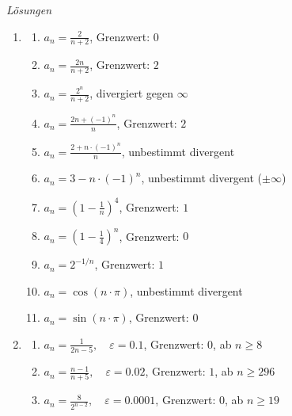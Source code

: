 \clearpage
\emph{Lösungen}
\begin{enumerate}
	\item \begin{enumerate}
		      \item $a_n = \frac{2}{n+2}$, \quad Grenzwert: $0$
		      \item $a_n = \frac{2n}{n+2}$, \quad Grenzwert: $2$
		      \item $a_n = \frac{2^n}{n+2}$, \quad divergiert gegen $\infty$
		      \item $a_n = \frac{2n + (-1)^n}{n}$, \quad Grenzwert: $2$
		      \item $a_n = \frac{2 + n \cdot (-1)^n}{n}$, \quad unbestimmt divergent
		      \item $a_n = 3 - n \cdot (-1)^n$, \quad unbestimmt divergent ($\pm \infty$)
		      \item $a_n = \left(1 - \frac{1}{n}\right)^4$, \quad Grenzwert: $1$
		      \item $a_n = \left(1 - \frac{1}{4}\right)^n$, \quad Grenzwert: $0$
		      \item $a_n = 2^{-1/n}$, \quad Grenzwert: $1$
		      \item $a_n = \cos(n\cdot \pi)$, \quad unbestimmt divergent
		      \item $a_n = \sin(n\cdot \pi)$, \quad Grenzwert: $0$
	      \end{enumerate}

	\item
	      \begin{enumerate}
		      \item $a_n = \frac{1}{2n - 5}, \quad \varepsilon = 0.1$, \quad Grenzwert: $0$, ab $n \geq 8$
		      \item $a_n = \frac{n - 1}{n + 5}, \quad \varepsilon = 0.02$, \quad Grenzwert: $1$, ab $n \geq 296$
		      \item $a_n = \frac{8}{2^{n-2}}, \quad \varepsilon = 0.0001$, \quad Grenzwert: $0$, ab $n \geq 19$
	      \end{enumerate}



\end{enumerate}


























